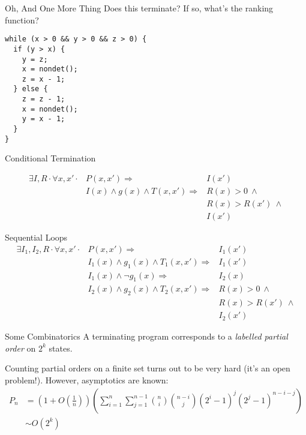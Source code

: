 \documentclass[xcolor=pdftex,t,11pt]{beamer}
\begin{document}
\begin{frame}[fragile]{Oh, And One More Thing}
Does this terminate?  If so, what's the ranking function?

\begin{lstlisting}[basicstyle=\normalsize]
while (x > 0 && y > 0 && z > 0) {
  if (y > x) {
    y = z;
    x = nondet();
    z = x - 1;
  } else {
    z = z - 1;
    x = nondet();
    y = x - 1;
  }
}
\end{lstlisting}
\end{frame}


\begin{frame}{Conditional Termination}

\begin{align*}
\exists I, R \cdot \forall x, x' \cdot & P(x, x') \Rightarrow & I(x') \\
                                       & I(x) \wedge g(x) \wedge T(x, x') \Rightarrow & R(x) > 0 ~ \wedge \\
                                       & & R(x) > R(x') ~ \wedge \\
                                       & & I(x')
\end{align*}
\end{frame}

\begin{frame}{Sequential Loops}
\begin{align*}
\exists I_1, I_2, R \cdot \forall x, x' \cdot & P(x, x') \Rightarrow & I_1(x') \\
                                              & I_1(x) \wedge g_1(x) \wedge T_1(x, x') \Rightarrow & I_1(x') \\
                                              & I_1(x) \wedge \lnot g_1(x) \Rightarrow & I_2(x) \\
					      & I_2(x) \wedge g_2(x) \wedge T_2(x, x') \Rightarrow & R(x) > 0 ~ \wedge \\
					      & & R(x) > R(x') ~ \wedge \\
					      & & I_2(x')
\end{align*}
\end{frame}


\begin{frame}{Some Combinatorics}
A terminating program corresponds to a \emph{labelled partial order} on $2^k$ states.

\vspace{.7em}

Counting partial orders on a finite set turns out to be very hard (it's an open problem!).  However, asymptotics are known:
\begin{align*}
 P_n & = \left(1 + O \left( \frac{1}{n} \right) \right) \left( \sum_{i=1}^n \sum_{j=1}^{n-1} \binom{n}{i} \binom{n-i}{j} (2^i - 1)^j (2^j - 1)^{n - i - j}\right) \\
     & \sim O\left( 2^k \right)
\end{align*}

\end{frame}
\end{document}
